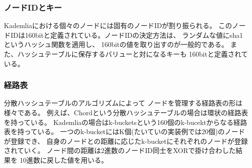 \documentclass[sotsuron]{jcsie}
\begin{document}
\subsubsection{ノードIDとキー}
Kademliaにおける個々のノードには固有のノードIDが割り振られる。
このノードIDは160bitと定義されている。ノードIDの決定方法は、
ランダムな値にsha1というハッシュ関数を適用し、
160bitの値を取り出すのが一般的である。
また、ハッシュテーブルに保存するバリューと対になるキーも
160bitと定義されている。
\subsubsection{経路表}
分散ハッシュテーブルのアルゴリズムによって
ノードを管理する経路表の形は様々である。
例えば、Chordという分散ハッシュテーブルの場合は環状の経路表を持っている。
Kademliaの場合はk-bucketsという160個のk-bucektからなる経路表を持っている。
一つのk-bucketにはK個(たいていの実装例では20個)のノードが登録でき、
自身のノードとの距離に応じたk-bucketにそれぞれのノードが登録されていく。
ノード間の距離は2進数のノードID同士をXORで掛け合わした結果を
10進数に戻した値を用いる。
\end{document}
